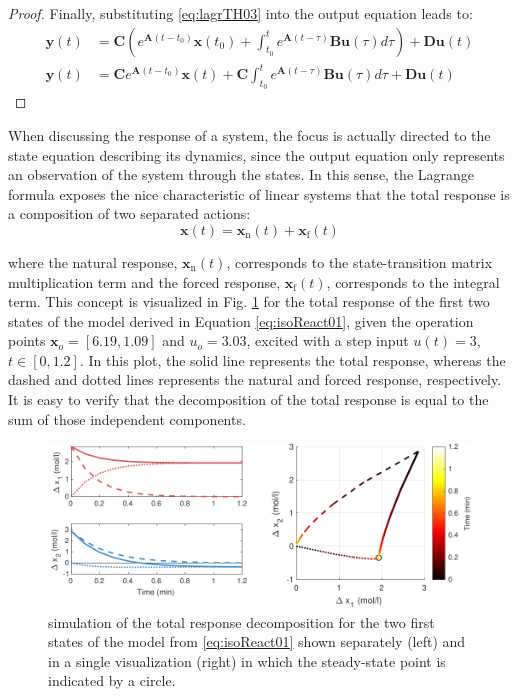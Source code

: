 \documentclass[a4paper,11pt]{book}
\numberwithin{figure}{chapter}
\numberwithin{equation}{chapter}
\numberwithin{table}{chapter}
\theoremstyle{definition}
\begin{document}
\begin{proof}
	Finally, substituting \eqref{eq:lagrTH03} into the output equation leads to:
	\begin{equation} \label{eq:lagrTH04}
	\begin{split}
	    \bm{y}(t) &= \bm{C} \left( e^{\bm{A} (t - t_0)} \bm{x}(t_0) + \int_{t_0}^{t} e^{\bm{A}(t - \tau)} \bm{B} \bm{u}(\tau) d\tau \right) + \bm{D} \bm{u}(t) \\ 
	    \bm{y}(t) &= \bm{C} e^{\bm{A}(t - t_0)} \bm{x}(t) + \bm{C} \int_{t_0}^{t} e^{\bm{A}(t - \tau)} \bm{B} \bm{u}(\tau) d \tau + \bm{D} \bm{u}(t) 
    \end{split}
	\end{equation}
\end{proof}

When discussing the response of a system, the focus is actually directed to the state equation describing its dynamics, since the output equation only represents an observation of the system through the states. In this sense, the Lagrange formula exposes the nice characteristic of linear systems that the total response is a composition of two separated actions:
\begin{equation}
    \bm{x}(t) = \bm{x}_{\text{n}}(t) + \bm{x}_{\text{f}}(t) 
\end{equation}

\noindent where the natural response, $\bm{x}_{\text{n}}(t)$, corresponds to the state-transition matrix multiplication term and the forced response, $\bm{x}_{\text{f}}(t)$, corresponds to the integral term. This concept is visualized in Fig. \ref{fig:linResp02} for the total response of the first two states of the model derived in Equation \eqref{eq:isoReact01}, given the operation points $\bm{x}_o = [6.19, 1.09]$ and $u_o = 3.03$, excited with a step input $u(t) = 3$, $t \in [0, 1.2]$. In this plot, the solid line represents the total response, whereas the dashed and dotted lines represents the natural and forced response, respectively. It is easy to verify that the decomposition of the total response is equal to the sum of those independent components.

\begin{figure}[ht]
	\centering
	\includegraphics[width=\textwidth]{chapter2/linResp02}
	\caption{simulation of the total response decomposition for the two first states of the model from \eqref{eq:isoReact01} shown separately (left) and in a single visualization (right) in which the steady-state point is indicated by a circle.}
	\label{fig:linResp02}
\end{figure}
\end{document}
